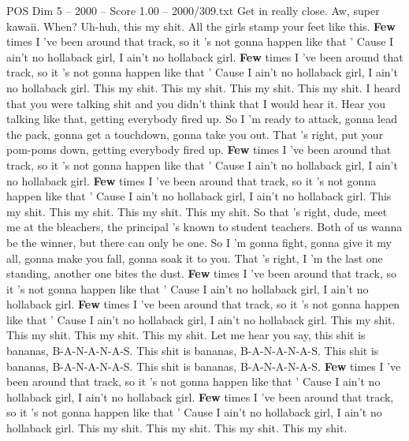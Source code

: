 \begin{textsample}{POS Dim 5 – 2000 – Score 1.00 – 2000/309.txt}  \label{ex:f5_pos_019}
Get in really close.
Aw, super kawaii.
When?
Uh-huh, this my shit.
All the girls stamp your feet like this. \textbf{Few} times I 've been around that track, so it 's not gonna happen like that ' Cause I ain't no hollaback girl, I ain't no hollaback girl. \textbf{Few} times I 've been around that track, so it 's not gonna happen like that ' Cause I ain't no hollaback girl, I ain't no hollaback girl.
This my shit.
This my shit.
This my shit.
This my shit.
I heard that you were talking shit and you didn't think that I would hear it.
Hear you talking like that, getting everybody fired up.
So I 'm ready to attack, gonna lead the pack, gonna get a touchdown, gonna take you out.
That 's right, put your pom-poms down, getting everybody fired up. \textbf{Few} times I 've been around that track, so it 's not gonna happen like that ' Cause I ain't no hollaback girl, I ain't no hollaback girl. \textbf{Few} times I 've been around that track, so it 's not gonna happen like that ' Cause I ain't no hollaback girl, I ain't no hollaback girl.
This my shit.
This my shit.
This my shit.
This my shit.
So that 's right, dude, meet me at the bleachers, the principal 's known to student teachers.
Both of us wanna be the winner, but there can only be one.
So I 'm gonna fight, gonna give it my all, gonna make you fall, gonna soak it to you.
That 's right, I 'm the last one standing, another one bites the dust. \textbf{Few} times I 've been around that track, so it 's not gonna happen like that ' Cause I ain't no hollaback girl, I ain't no hollaback girl. \textbf{Few} times I 've been around that track, so it 's not gonna happen like that ' Cause I ain't no hollaback girl, I ain't no hollaback girl.
This my shit.
This my shit.
This my shit.
This my shit.
Let me hear you say, this shit is bananas, B-A-N-A-N-A-S.
This shit is bananas, B-A-N-A-N-A-S.
This shit is bananas, B-A-N-A-N-A-S.
This shit is bananas, B-A-N-A-N-A-S. \textbf{Few} times I 've been around that track, so it 's not gonna happen like that ' Cause I ain't no hollaback girl, I ain't no hollaback girl. \textbf{Few} times I 've been around that track, so it 's not gonna happen like that ' Cause I ain't no hollaback girl, I ain't no hollaback girl.
This my shit.
This my shit.
This my shit.
This my shit.

\end{textsample}
